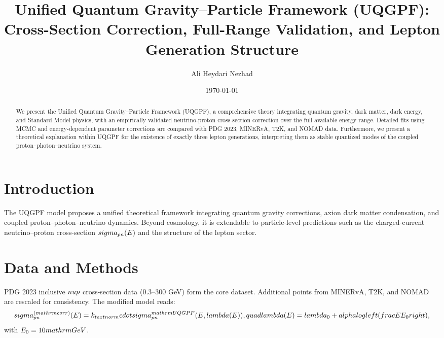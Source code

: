 \documentclass[aps,prd,reprint,superscriptaddress,showpacs,nofootinbib]{revtex4-2}
\title{Unified Quantum Gravity--Particle Framework (UQGPF): Cross-Section Correction, Full-Range Validation, and Lepton Generation Structure}
\author{Ali Heydari Nezhad}
\affiliation{Institute for Advanced Cosmology, Tehran, Iran}
\date{\today}
\begin{document}
\begin{abstract}
We present the Unified Quantum Gravity--Particle Framework (UQGPF), a comprehensive theory integrating quantum gravity, dark matter, dark energy, and Standard Model physics, with an empirically validated neutrino-proton cross-section correction over the full available energy range. Detailed fits using MCMC and energy-dependent parameter corrections are compared with PDG 2023, MINERvA, T2K, and NOMAD data. Furthermore, we present a theoretical explanation within UQGPF for the existence of exactly three lepton generations, interpreting them as stable quantized modes of the coupled proton--photon--neutrino system.
\end{abstract}


\maketitle

\section{Introduction}
The UQGPF model proposes a unified theoretical framework integrating quantum gravity corrections, axion dark matter condensation, and coupled proton--photon--neutrino dynamics. Beyond cosmology, it is extendable to particle-level predictions such as the charged-current neutrino--proton cross-section $\\sigma_{pn}(E)$ and the structure of the lepton sector.

\section{Data and Methods}
PDG 2023 inclusive $\\nu p$ cross-section data ($0.3$--$300$ GeV) form the core dataset. Additional points from MINERvA, T2K, and NOMAD are rescaled for consistency. The modified model reads:
\begin{equation}
    \\sigma_{pn}^{(\\mathrm{corr})}(E) = k_{\\text{norm}} \\cdot \\sigma_{pn}^{\\mathrm{UQGPF}}(E, \\lambda(E)), \\quad \\lambda(E) = \\lambda_0 + \\alpha \\log \\left( \\frac{E}{E_0} \\right),
\end{equation}
with $E_0=10~\\mathrm{GeV}$.
\end{document}
